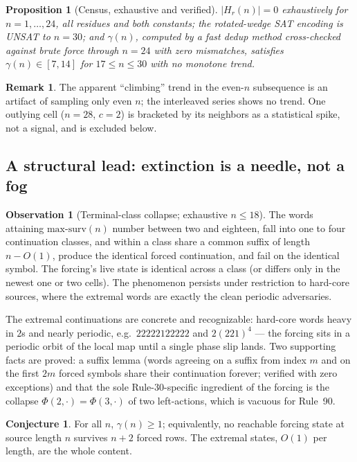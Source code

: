 \documentclass[11pt]{article}
\newtheorem{proposition}[theorem]{Proposition}
\theoremstyle{definition}
\newtheorem{conjecture}[theorem]{Conjecture}
\newtheorem{observation}[theorem]{Observation}
\newtheorem{remark}[theorem]{Remark}
\newcommand{\gm}{\gamma}
\begin{document}
\begin{proposition}[Census, exhaustive and verified]\label{prop:census}
$|H_r(n)|=0$ exhaustively for $n=1,\dots,24$, all residues and both constants;
the rotated-wedge SAT encoding is UNSAT to $n=30$; and $\gm(n)$, computed by a
fast dedup method cross-checked against brute force through $n=24$ with zero
mismatches, satisfies $\gm(n)\in[7,14]$ for $17\le n\le30$ with no monotone
trend.
\end{proposition}

\begin{remark}
The apparent ``climbing'' trend in the even-$n$ subsequence is an artifact of
sampling only even $n$; the interleaved series shows no trend. One outlying
cell ($n=28$, $c=2$) is bracketed by its neighbors as a statistical spike, not
a signal, and is excluded below.
\end{remark}

\subsection{A structural lead: extinction is a needle, not a fog}

\begin{observation}[Terminal-class collapse; exhaustive $n\le18$]\label{obs:needle}
The words attaining $\mathrm{max\text{-}surv}(n)$ number between two and
eighteen, fall into one to four continuation classes, and within a class share a
common suffix of length $n-O(1)$, produce the identical forced continuation, and
fail on the identical symbol. The forcing's live state is identical across a
class (or differs only in the newest one or two cells). The phenomenon persists
under restriction to hard-core sources, where the extremal words are exactly the
clean periodic adversaries.
\end{observation}

The extremal continuations are concrete and recognizable: hard-core words
heavy in $2$s and nearly periodic, e.g.\ $22222122222$ and $2(221)^4$ ---
the forcing sits in a periodic orbit of the local map until a single phase
slip lands. Two supporting facts are proved: a suffix lemma (words agreeing on a suffix from
index $m$ and on the first $2m$ forced symbols share their continuation forever;
verified with zero exceptions) and that the sole Rule-30-specific ingredient of
the forcing is the collapse $\Phi(2,\cdot)=\Phi(3,\cdot)$ of two left-actions,
which is vacuous for Rule~90.

\begin{conjecture}\label{conj:needle}
For all $n$, $\gm(n)\ge1$; equivalently, no reachable forcing state at source
length $n$ survives $n+2$ forced rows. The extremal states, $O(1)$ per length,
are the whole content.
\end{conjecture}
\end{document}
